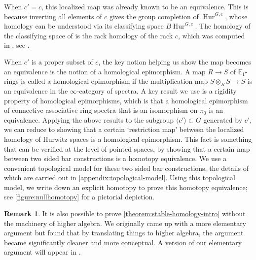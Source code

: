 \documentclass[12 pt]{amsart}
\theoremstyle{plain}
\theoremstyle{definition}
\newtheorem{remark}[theorem]{Remark}
\theoremstyle{remark}
\numberwithin{equation}{section}
\DeclareMathOperator\Hur{Hur}
\newcommand\EE{\mathbb{E}}
\begin{document}
When $c' = c$, this localized map was already known to be an equivalence. This is because inverting all elements of $c$ gives the group completion of $\Hur^{G,c}$, whose homology can be understood via its classifying space $B\Hur^{G,c}$. The homology of the classifying space of is the rack homology of the rack $c$, which was
computed in \cite{etingof2003rack}, see \cite[Corollary 5.4]{randal-williams:homology-of-hurwitz-spaces}.

When $c'$ is a proper subset of $c$, the key notion helping us show the map
becomes an equivalence is the notion of a homological epimorphism. A map $R \to
S$ of $\EE_1$-rings is called a homological epimorphism if the multiplication
map $S\otimes_RS \to S$ is an equivalence in the $\infty$-category of spectra. A
key result we use is a rigidity property of homological epimorphisms, which is
that a homological epimorphism of connective associative ring spectra that is an
isomorphism on $\pi_0$ is an equivalence. 
Applying the above results to the subgroup $\langle c' \rangle \subset G$
generated by $c'$, we can reduce to showing that a certain `restriction map' between the localized homology of Hurwitz spaces is a homological epimorphism. This fact is something that can be verified at the level of pointed spaces, by showing that a certain map between two sided bar constructions is a homotopy equivalence. We use a convenient topological model for these two sided bar constructions, the details of which are carried out in \autoref{appendix:topological-model}. Using this topological model, we write down an explicit homotopy to prove this homotopy equivalence;
see \autoref{figure:nullhomotopy} for a pictorial depiction.

\begin{remark}
	\label{remark:otherproof}
	It is also possible to prove \autoref{theorem:stable-homology-intro}
	without the
machinery of higher algebra. We originally came up with a more elementary argument but found that by translating things to higher
algebra, the argument became significantly cleaner and more conceptual. 
A version of our elementary argument will appear in
\cite{landesmanL:an-alternate-computation}.
\end{remark}
\end{document}
